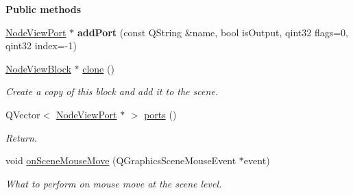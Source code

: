 \begin{Indent}\textbf{ Public methods}\par
\begin{DoxyCompactItemize}
\item 
\mbox{\label{classrev_1_1_view_1_1_node_view_block_a7a66cbd1d1cdf38449e5b95c552fbf54}} 
\mbox{\hyperlink{classrev_1_1_view_1_1_node_view_port}{Node\+View\+Port}} $\ast$ {\bfseries add\+Port} (const Q\+String \&name, bool is\+Output, qint32 flags=0, qint32 index=-\/1)
\item 
\mbox{\label{classrev_1_1_view_1_1_node_view_block_a290344cbc89d46cd0152f74b21dff8fb}} 
\mbox{\hyperlink{classrev_1_1_view_1_1_node_view_block}{Node\+View\+Block}} $\ast$ \mbox{\hyperlink{classrev_1_1_view_1_1_node_view_block_a290344cbc89d46cd0152f74b21dff8fb}{clone}} ()
\begin{DoxyCompactList}\small\item\em Create a copy of this block and add it to the scene. \end{DoxyCompactList}\item 
\mbox{\label{classrev_1_1_view_1_1_node_view_block_a076ddde3f5bd8659bd99fac60b407063}} 
Q\+Vector$<$ \mbox{\hyperlink{classrev_1_1_view_1_1_node_view_port}{Node\+View\+Port}} $\ast$ $>$ \mbox{\hyperlink{classrev_1_1_view_1_1_node_view_block_a076ddde3f5bd8659bd99fac60b407063}{ports}} ()
\begin{DoxyCompactList}\small\item\em Return. \end{DoxyCompactList}\item 
\mbox{\label{classrev_1_1_view_1_1_node_view_block_a827734de9c5b462f7459f5f5f1fc9bf7}} 
void \mbox{\hyperlink{classrev_1_1_view_1_1_node_view_block_a827734de9c5b462f7459f5f5f1fc9bf7}{on\+Scene\+Mouse\+Move}} (Q\+Graphics\+Scene\+Mouse\+Event $\ast$event)
\begin{DoxyCompactList}\small\item\em What to perform on mouse move at the scene level. \end{DoxyCompactList}\end{DoxyCompactItemize}
\end{Indent}
